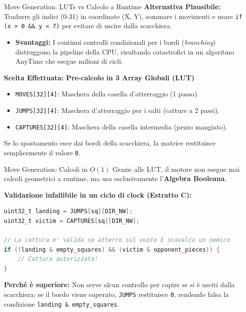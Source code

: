 \documentclass[10pt]{beamer}
\begin{document}
\begin{frame}[fragile]{Move Generation: LUTs vs Calcolo a Runtime}
    \textbf{Alternativa Plausibile:} Tradurre gli indici (0-31) in coordinate (X, Y), sommare i movimenti e usare \texttt{if (x > 0 \&\& y < 7)} per evitare di uscire dalla scacchiera.
    \begin{itemize}
        \item \textbf{Svantaggi:} I continui controlli condizionali per i bordi (\textit{branching}) distruggono la pipeline della CPU, risultando catastrofici in un algoritmo AnyTime che esegue milioni di cicli.
    \end{itemize}
    
    \vspace{0.1cm}
    \textbf{Scelta Effettuata: Pre-calcolo in 3 Array Globali (LUT)}
    \begin{itemize}
        \item \texttt{MOVES[32][4]}: Maschera della casella d'atterraggio (1 passo).
        \item \texttt{JUMPS[32][4]}: Maschera d'atterraggio per i salti (catture a 2 passi).
        \item \texttt{CAPTURES[32][4]}: Maschera della casella intermedia (pezzo mangiato).
    \end{itemize}
    Se lo spostamento esce dai bordi della scacchiera, la matrice restituisce semplicemente il valore \texttt{0}.
\end{frame}

\begin{frame}[fragile]{Move Generation: Calcoli in $O(1)$}
    Grazie alle LUT, il motore non esegue mai calcoli geometrici a runtime, ma usa esclusivamente l'\textbf{Algebra Booleana}.
    
    \vspace{0.2cm}
    \textbf{Validazione infallibile in un ciclo di clock (Estratto C):}
\begin{lstlisting}[language=C, basicstyle=\ttfamily\footnotesize, keywordstyle=\color{blue}]
uint32_t landing = JUMPS[sq][DIR_NW]; 
uint32_t victim = CAPTURES[sq][DIR_NW];

// La cattura e' valida se atterro sul vuoto E scavalco un nemico
if ((landing & empty_squares) && (victim & opponent_pieces)) {
    // Cattura autorizzata!
}
\end{lstlisting}
    \vspace{0.1cm}
    \textbf{Perché è superiore:} Non serve alcun controllo per capire se si è usciti dalla scacchiera: se il bordo viene superato, \texttt{JUMPS} restituisce \texttt{0}, rendendo falsa la condizione \texttt{landing \& empty\_squares}.
\end{frame}
\end{document}
